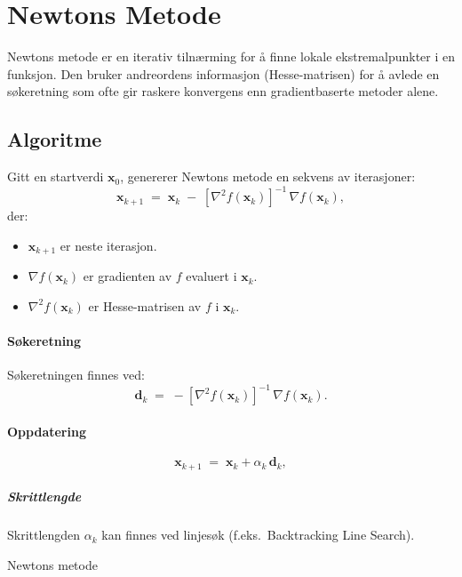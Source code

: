 \section{Newtons Metode}\label{sec:newtons_method}

Newtons metode er en iterativ tilnærming for å finne lokale ekstremalpunkter i en funksjon. Den bruker andreordens informasjon (Hesse-matrisen) for å avlede en søkeretning som ofte gir raskere konvergens enn gradientbaserte metoder alene.

\subsection{Algoritme}
Gitt en startverdi \( \symbf{x}_0 \), genererer Newtons metode en sekvens av iterasjoner:
\[
  \symbf{x}_{k+1}
  \;=\;
  \symbf{x}_k
  \;-\;
  [\nabla^2 f(\symbf{x}_k)]^{-1} \,\nabla f(\symbf{x}_k),
\]
der:
\begin{itemize}
  \item \(\symbf{x}_{k+1}\) er neste iterasjon.
  \item \(\nabla f(\symbf{x}_k)\) er gradienten av \(f\) evaluert i \(\symbf{x}_k\).
  \item \(\nabla^2 f(\symbf{x}_k)\) er Hesse-matrisen av \(f\) i \(\symbf{x}_k\).
\end{itemize}

\paragraph{Søkeretning}
Søkeretningen finnes ved:
\[
  \symbf{d}_k
  \;=\;
  -[\nabla^2 f(\symbf{x}_k)]^{-1}\,\nabla f(\symbf{x}_k).
\]
\paragraph{Oppdatering}
\[
  \symbf{x}_{k+1}
  \;=\;
  \symbf{x}_k + \alpha_k \,\symbf{d}_k,
\]
\subparagraph{Skrittlengde}
Skrittlengden \(\alpha_k\) kan finnes ved linjesøk (f.eks.\ Backtracking Line Search).

\begin{algorithm}[H]
  \SetAlgoLined
  \caption{Newtons metode}
\end{algorithm}

